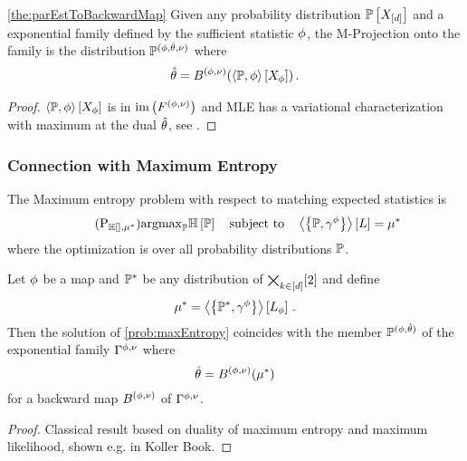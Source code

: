 \begin{theorem}\ref{the:parEstToBackwardMap}
	Given any probability distribution $\mathbb{P}\left[X_{[d]}\right]$ and a exponential family defined by the sufficient statistic $\phi$, the M-Projection onto the family is the distribution $\mathbb{P}^{(\phi,\hat{\theta},\nu)}$ where
	\begin{align*}
		\hat{\theta} = B^{(\phi,\nu)}(\left\langle \mathbb{P},\phi\right\rangle \left[ X_{\phi} \right]) \, .
	\end{align*}
\end{theorem}
\begin{proof}
	$\left\langle \mathbb{P},\phi\right\rangle \left[ X_{\phi} \right]$ is in $\mathrm{im}\left(F^{(\phi,\nu)}\right)$ and MLE has a variational characterization with maximum at the dual $\hat{\theta}$, see \cite{wainwright_graphical_2008}.
\end{proof}





\subsubsection{Connection with Maximum Entropy}\label{sec:maxEntDuality}


The Maximum entropy problem with respect to matching expected statistics is
\begin{align}\tag{$\mathrm{P}_{\sentropyof{}, \genmean}$}\label{prob:maxEntropy}
	\argmax_{\probtensor} \sentropyof{\probtensor} \quad \text{subject to} \quad 
	 \sbcontractionof{\probtensor,\sencodingof{\sstat}}{\selvariable} =  \genmean
\end{align}
where the optimization is over all probability distributions $\mathbb{P}$.


\begin{theorem}\label{the:maxEntMaxLikeDuality}
	Let $\phi$ be a map and $\mathbb{P}^*$ be any distribution of $\bigtimes_{k\in[d]}[2]$ and define
		\[ \mu^* = \left\langle \left\{\mathbb{P}^*,\gamma^{\phi}\right\}\right\rangle \left[ L_{\phi} \right] \, .  \]
	Then the solution of \ref{prob:maxEntropy} coincides with the member $\mathbb{P}^{(\phi,\hat{\theta})}$ of the exponential family $\Gamma^{\phi,\nu}$ where
		\[ \hat{\theta} = B^{(\phi,\nu)}(\mu^*)\]
	for a backward map $B^{(\phi,\nu)}$ of $\Gamma^{\phi,\nu}$.
\end{theorem}
\begin{proof}
	Classical result based on duality of maximum entropy and maximum likelihood, shown e.g. in Koller Book.
\end{proof}

